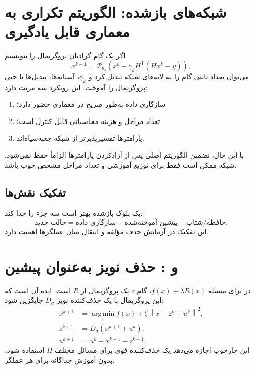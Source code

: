 \documentclass[12pt,openany,oneside]{book}
\newcommand{\norm}[1]{\left\lVert #1\right\rVert}
\newcommand{\trans}{^{\mathsf T}}
\newcommand{\argmin}{\operatorname*{arg\,min}}
\begin{document}
\section{شبکه‌های بازشده: الگوریتم تکراری به معماری قابل یادگیری}

اگر یک گام گرادیان پروگزیمال را بنویسیم
\begin{equation}
x^{k+1}=\mathcal P_{\theta_k}\left(x^k-\gamma_k H\trans(Hx^k-y)\right),
\end{equation}
می‌توان تعداد ثابتی گام را به لایه‌های شبکه تبدیل کرد و \(\gamma_k\)، آستانه‌ها، تبدیل‌ها یا حتی پروگزیمال را آموخت.
این رویکرد  سه مزیت دارد:
\begin{enumerate}
\item سازگاری داده به‌طور صریح در معماری حضور دارد؛
\item تعداد مراحل و هزینه محاسباتی قابل کنترل است؛
\item پارامترها تفسیرپذیرتر از شبکه جعبه‌سیاه‌اند.
\end{enumerate}
با این حال، تضمین الگوریتم اصلی پس از آزادکردن پارامترها الزاماً حفظ نمی‌شود. شبکه ممکن است فقط برای توزیع آموزشی و تعداد مراحل مشخص خوب باشد.

\subsection{تفکیک نقش‌ها}
یک بلوک بازشده بهتر است سه جزء را جدا کند:
\begin{equation}
\text{حالت جدید}
=\text{سازگاری داده} + \text{پیشین آموخته‌شده} + \text{حافظه/شتاب}.
\end{equation}
این تفکیک در آزمایش حذف مؤلفه و انتقال میان عملگرها اهمیت دارد.

\section{ و : حذف نویز به‌عنوان پیشین}

در  برای مسئله \(f(x)+\lambda R(x)\)، گام \(z\) یک پروگزیمال از \(R\) است. ایده 
آن است که این پروگزیمال با یک حذف‌کننده نویز \(D_\sigma\) جایگزین شود:
\begin{align}
x^{k+1}&=\argmin_x f(x)+\frac\rho2\norm{x-z^k+u^k}^2,\\
z^{k+1}&=D_\sigma(x^{k+1}+u^k),\\
u^{k+1}&=u^k+x^{k+1}-z^{k+1}.
\label{eq:pnp-admm}
\end{align}
این چارچوب اجازه می‌دهد یک حذف‌کننده قوی برای مسائل مختلف \(H\) استفاده شود، بدون آموزش جداگانه برای هر عملگر.
\end{document}
